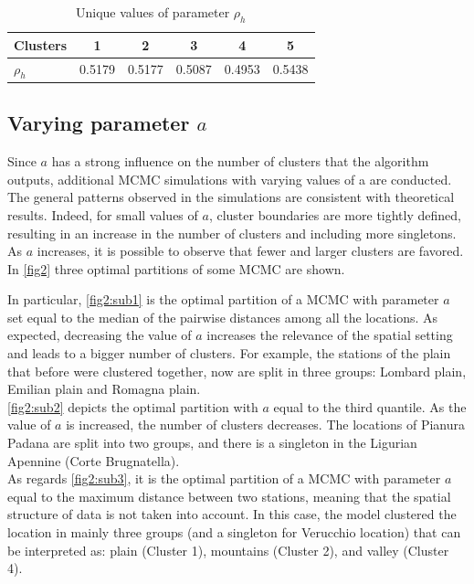 \documentclass[12pt,a4paper]{article}
\begin{document}



\begin{table}[ht]
\centering
\begin{tabular}{|l|c|c|c|c|c|}
\hline
\textbf{Clusters} & 1 & 2 & 3 & 4 & 5\\
\hline
\textbf{$\rho_h$} & 0.5179 & 0.5177 & 0.5087 & 0.4953 & 0.5438 \\
\hline
\end{tabular}
\caption{Unique values of parameter $\rho_h$}
\label{table1}
\end{table}









\subsection{Varying parameter $a$}
Since $a$ has a strong influence on the number of clusters that the algorithm outputs, additional MCMC simulations with varying values of a are conducted. The general patterns observed in the simulations are consistent with theoretical results. Indeed, for small values of $a$, cluster boundaries are more tightly defined, resulting in an increase in the number of clusters and including more singletons. As $a$ increases, it is possible to observe that fewer and larger clusters are favored.
In \autoref{fig2} three optimal partitions of some MCMC are shown. 

In particular, \autoref{fig2:sub1} is the optimal partition of a MCMC with parameter $a$ set equal to the median of the pairwise distances among all the locations. As expected, decreasing the value of $a$ increases the relevance of the spatial setting and leads to a bigger number of clusters. For example, the stations of the plain that before were clustered together, now are split in three groups: Lombard plain, Emilian plain and Romagna plain.  \\
\autoref{fig2:sub2} depicts the optimal partition with $a$ equal to the third quantile. As the value of $a$ is increased, the number of clusters decreases. The locations of Pianura Padana are split into two groups, and there is a singleton in the Ligurian Apennine (Corte Brugnatella). \\
As regards \autoref{fig2:sub3}, it is the optimal partition of a MCMC with parameter $a$ equal to the maximum distance between two stations, meaning that the spatial structure of data is not taken into account. In this case, the model clustered the location in mainly three groups (and a singleton for Verucchio location) that can be interpreted as: plain (Cluster 1), mountains (Cluster 2), and valley (Cluster 4).
\end{document}
